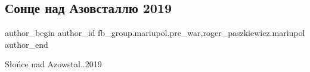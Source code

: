  
 
 
 
 

\subsection{Сонце над Азовсталлю 2019}
\label{sec:02_03_2023.fb.fb_group.mariupol.pre_war.2.sontse_nad_azovstall}
 
\ifcmt
 author_begin
   author_id fb_group.mariupol.pre_war,roger_paszkiewicz.mariupol
 author_end
\fi

Słońce nad Azowstal..2019

